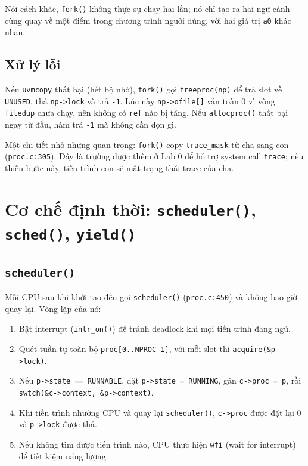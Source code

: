 Nói cách khác, \texttt{fork()} không thực sự chạy hai lần; nó chỉ tạo ra hai ngữ cảnh cùng quay về một điểm trong chương trình người dùng, với hai giá trị \texttt{a0} khác nhau.

\subsection{Xử lý lỗi}

Nếu \texttt{uvmcopy} thất bại (hết bộ nhớ), \texttt{fork()} gọi \texttt{freeproc(np)} để trả slot về \texttt{UNUSED}, thả \texttt{np->lock} và trả \texttt{-1}. Lúc này \texttt{np->ofile[]} vẫn toàn 0 vì vòng \texttt{filedup} chưa chạy, nên không có \texttt{ref} nào bị tăng. Nếu \texttt{allocproc()} thất bại ngay từ đầu, hàm trả \texttt{-1} mà không cần dọn gì.

Một chi tiết nhỏ nhưng quan trọng: \texttt{fork()} copy \texttt{trace\_mask} từ cha sang con (\texttt{proc.c:305}). Đây là trường được thêm ở Lab 0 để hỗ trợ system call \texttt{trace}; nếu thiếu bước này, tiến trình con sẽ mất trạng thái trace của cha.

\section{Cơ chế định thời: \texttt{scheduler()}, \texttt{sched()}, \texttt{yield()}}

\subsection{\texttt{scheduler()}}

Mỗi CPU sau khi khởi tạo đều gọi \texttt{scheduler()} (\texttt{proc.c:450}) và không bao giờ quay lại. Vòng lặp của nó:

\begin{enumerate}[itemsep=0pt, topsep=2.5pt, leftmargin=1.5cm]
    \item Bật interrupt (\texttt{intr\_on()}) để tránh deadlock khi mọi tiến trình đang ngủ.
    \item Quét tuần tự toàn bộ \texttt{proc[0..NPROC-1]}, với mỗi slot thì \texttt{acquire(\&p->lock)}.
    \item Nếu \texttt{p->state == RUNNABLE}, đặt \texttt{p->state = RUNNING}, gán \texttt{c->proc = p}, rồi \texttt{swtch(\&c->context, \&p->context)}.
    \item Khi tiến trình nhường CPU và quay lại \texttt{scheduler()}, \texttt{c->proc} được đặt lại 0 và \texttt{p->lock} được thả.
    \item Nếu không tìm được tiến trình nào, CPU thực hiện \texttt{wfi} (wait for interrupt) để tiết kiệm năng lượng.
\end{enumerate}

